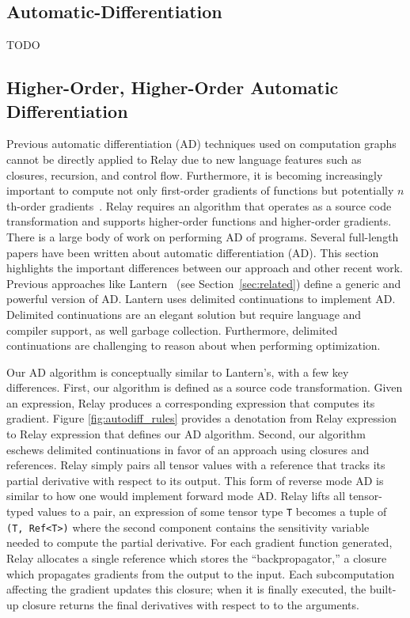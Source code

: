 \subsection{Automatic-Differentiation}
TODO

\subsection{Higher-Order, Higher-Order Automatic Differentiation}
\label{sec:autodiff}

Previous automatic differentiation (AD) techniques used on
  computation graphs cannot be directly applied to Relay due to new
  language features such as closures, recursion, and control flow.
Furthermore, it is becoming increasingly important to compute not
  only first-order gradients of functions
  but potentially $n$th-order gradients~\cite{neural_ode, darts}.
Relay requires an algorithm that operates as a source code transformation
  and supports higher-order functions and higher-order gradients.
There is a large body of work on performing AD
  of programs.
Several full-length papers have been written about automatic
  differentiation (AD).
This section highlights the important differences
  between our approach and other recent work.
Previous approaches like Lantern~\cite{lantern} (see Section~\ref{sec:related})
  define a generic and powerful version of AD.
Lantern uses delimited continuations to implement AD.
Delimited continuations are an elegant solution
  but require language and compiler support,
  as well garbage collection.
Furthermore, delimited continuations are challenging
  to reason about when performing optimization.

Our AD algorithm is conceptually similar to Lantern's,
  with a few key differences.
First, our algorithm is defined as a source code
  transformation.
Given an expression, Relay produces a corresponding
  expression that computes its gradient.
Figure \ref{fig:autodiff_rules} provides a denotation from
  Relay expression to Relay expression that defines our
  AD algorithm.
Second, our algorithm eschews delimited continuations in favor of
  an approach using closures and references.
Relay simply pairs all tensor values with a reference
  that tracks its partial derivative with respect to its
  output.
This form of reverse mode AD is similar to how one
  would implement forward mode AD.
Relay lifts all tensor-typed values to a pair,
  an expression of some tensor type \verb|T| becomes a tuple of \verb|(T, Ref<T>)|
  where the second component contains the sensitivity variable
  needed to compute the partial derivative.
For each gradient function generated, Relay allocates
  a single reference which stores the ``backpropagator,''
  a closure which propagates gradients from the output to the input.
Each subcomputation affecting the gradient updates this closure; when it is
  finally executed, the built-up closure returns the final derivatives with respect to
  to the arguments.


